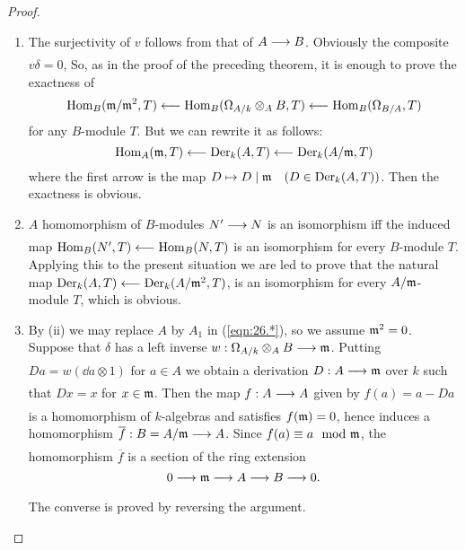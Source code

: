 \documentclass[../main]{subfiles}
\begin{document}
\begin{proof}
\begin{enumerate}
    \item The surjectivity of $v$ follows from that of $A \varrightarrow{} B$. Obviously the composite $v \delta=0$, So, as in the proof of the preceding theorem, it is enough to prove the exactness of \[\operatorname{Hom}_B(\mathfrak{m}/\mathfrak{m}^2, T)\longleftarrow\operatorname{Hom}_B(\Omega_{A / k} \otimes_A B, T)\longleftarrow\operatorname{Hom}_B(\Omega_{B / A}, T)\] for any $B$-module $T$. But we can rewrite it as follows: \[\operatorname{Hom}_A(\mathfrak{m}, T)\longleftarrow\operatorname{Der}_k(A, T)\longleftarrow\operatorname{Der}_k(A / \mathfrak{m}, T)\] where the first arrow is the map $D \mapsto D \mid \ideal{m} \for{D\in \Der_k(A, T)}$. Then the exactness is obvious.

    \item $A$ homomorphism of $B$-modules $N' \varrightarrow{} N$ is an isomorphism iff the induced map $\operatorname{Hom}_B(N', T) \longleftarrow \operatorname{Hom}_B(N, T)$ is an isomorphism for every $B$-module $T$. Applying this to the present situation we are led to prove that the natural map $\operatorname{Der}_k(A, T)\longleftarrow \operatorname{Der}_k(A / \mathfrak{m}^2,T)$, is an isomorphism for every $A/\mathfrak{m}$-module $T$, which is obvious.

    \item By (ii) we may replace $A$ by $A_1$ in (\ref{eqn:26.*}), so we assume $\mathfrak{m}^2=0$. Suppose that $\delta$ has a left inverse $w: \Omega_{A / k} \otimes_A B \varrightarrow{} \ideal{m}$. Putting $Da =w(\dd a \otimes 1)$ for $a\in A$ we obtain a derivation $D: A\varrightarrow{} \ideal{m}$ over $k$ such that $D x=x$ for $x \in \mathfrak{m}$. Then the map $f: A \varrightarrow{} A$ given by $f(a)=a-Da$ is a homomorphism of $k$-algebras and satisfies $f(\mathfrak{m})=0$, hence induces a homomorphism $\overline{f}: B=A / \ideal{m}\varrightarrow{}A$. Since $f(a) \equiv a \mod \ideal{m}$, the homomorphism $\overline{f}$ is a section of the ring extension \[0 \varrightarrow{} \ideal{m} \varrightarrow{} A \varrightarrow{} B \varrightarrow{} 0.\] The converse is proved by reversing the argument.
\end{enumerate}
\end{proof}
\end{document}
